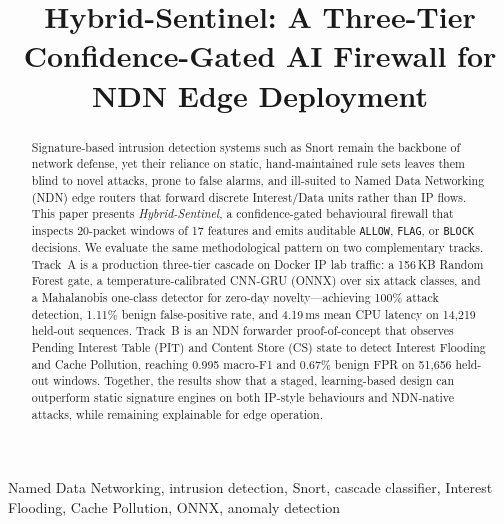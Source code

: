 \documentclass[10pt,conference]{IEEEtran}
\begin{document}
\title{Hybrid-Sentinel: A Three-Tier Confidence-Gated AI Firewall
       for NDN Edge Deployment}

\author{%
}

\maketitle

\begin{abstract}
Signature-based intrusion detection systems such as Snort remain the
backbone of network defense, yet their reliance on static,
hand-maintained rule sets leaves them blind to novel attacks, prone to
false alarms, and ill-suited to Named Data Networking (NDN) edge routers
that forward discrete Interest/Data units rather than IP flows.
This paper presents \textit{Hybrid-Sentinel}, a confidence-gated
behavioural firewall that inspects 20-packet windows of 17 features and
emits auditable \texttt{ALLOW}, \texttt{FLAG}, or \texttt{BLOCK}
decisions. We evaluate the same methodological pattern on two
complementary tracks. Track~A is a production three-tier cascade on
Docker IP lab traffic: a 156\,KB Random Forest gate, a
temperature-calibrated CNN-GRU (ONNX) over six attack classes, and a
Mahalanobis one-class detector for zero-day novelty---achieving 100\%
attack detection, 1.11\% benign false-positive rate, and 4.19\,ms mean
CPU latency on 14{,}219 held-out sequences. Track~B is an NDN forwarder
proof-of-concept that observes Pending Interest Table (PIT) and Content
Store (CS) state to detect Interest Flooding and Cache Pollution,
reaching 0.995 macro-F1 and 0.67\% benign FPR on 51{,}656 held-out
windows. Together, the results show that a staged, learning-based design
can outperform static signature engines on both IP-style behaviours and
NDN-native attacks, while remaining explainable for edge operation.
\end{abstract}

\begin{IEEEkeywords}
Named Data Networking, intrusion detection, Snort, cascade classifier,
Interest Flooding, Cache Pollution, ONNX, anomaly detection
\end{IEEEkeywords}
\end{document}
